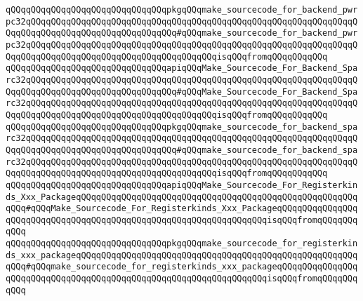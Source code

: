 \verb|qQQqqQQqqQQqqQQqqQQqqQQqqQQqqQQqpkgqQQqmake_sourcecode_for_backend_pwrpc32qQQqqQQqqQQqqQQqqQQqqQQqqQQqqQQqqQQqqQQqqQQqqQQqqQQqqQQqqQQqqQQqqQQqqQQqqQQqqQQqqQQqqQQqqQQqqQQqqQQq#qQQqmake_sourcecode_for_backend_pwrpc32qQQqqQQqqQQqqQQqqQQqqQQqqQQqqQQqqQQqqQQqqQQqqQQqqQQqqQQqqQQqqQQqqQQqqQQqqQQqqQQqqQQqqQQqqQQqqQQqqQQqqQQqqQQqisqQQqfromqQQqqQQqqQQq|\newline
\newline
\verb|qQQqqQQqqQQqqQQqqQQqqQQqqQQqqQQqapiqQQqMake_Sourcecode_For_Backend_Sparc32qQQqqQQqqQQqqQQqqQQqqQQqqQQqqQQqqQQqqQQqqQQqqQQqqQQqqQQqqQQqqQQqqQQqqQQqqQQqqQQqqQQqqQQqqQQqqQQqqQQq#qQQqMake_Sourcecode_For_Backend_Sparc32qQQqqQQqqQQqqQQqqQQqqQQqqQQqqQQqqQQqqQQqqQQqqQQqqQQqqQQqqQQqqQQqqQQqqQQqqQQqqQQqqQQqqQQqqQQqqQQqqQQqqQQqqQQqisqQQqfromqQQqqQQqqQQq|\newline
\verb|qQQqqQQqqQQqqQQqqQQqqQQqqQQqqQQqpkgqQQqmake_sourcecode_for_backend_sparc32qQQqqQQqqQQqqQQqqQQqqQQqqQQqqQQqqQQqqQQqqQQqqQQqqQQqqQQqqQQqqQQqqQQqqQQqqQQqqQQqqQQqqQQqqQQqqQQqqQQq#qQQqmake_sourcecode_for_backend_sparc32qQQqqQQqqQQqqQQqqQQqqQQqqQQqqQQqqQQqqQQqqQQqqQQqqQQqqQQqqQQqqQQqqQQqqQQqqQQqqQQqqQQqqQQqqQQqqQQqqQQqqQQqqQQqisqQQqfromqQQqqQQqqQQq|\newline
\newline
\verb|qQQqqQQqqQQqqQQqqQQqqQQqqQQqqQQqapiqQQqMake_Sourcecode_For_Registerkinds_Xxx_PackageqQQqqQQqqQQqqQQqqQQqqQQqqQQqqQQqqQQqqQQqqQQqqQQqqQQqqQQqqQQq#qQQqMake_Sourcecode_For_Registerkinds_Xxx_PackageqQQqqQQqqQQqqQQqqQQqqQQqqQQqqQQqqQQqqQQqqQQqqQQqqQQqqQQqqQQqqQQqqQQqisqQQqfromqQQqqQQqqQQq|\newline
\verb|qQQqqQQqqQQqqQQqqQQqqQQqqQQqqQQqpkgqQQqmake_sourcecode_for_registerkinds_xxx_packageqQQqqQQqqQQqqQQqqQQqqQQqqQQqqQQqqQQqqQQqqQQqqQQqqQQqqQQqqQQq#qQQqmake_sourcecode_for_registerkinds_xxx_packageqQQqqQQqqQQqqQQqqQQqqQQqqQQqqQQqqQQqqQQqqQQqqQQqqQQqqQQqqQQqqQQqqQQqisqQQqfromqQQqqQQqqQQq|\newline
